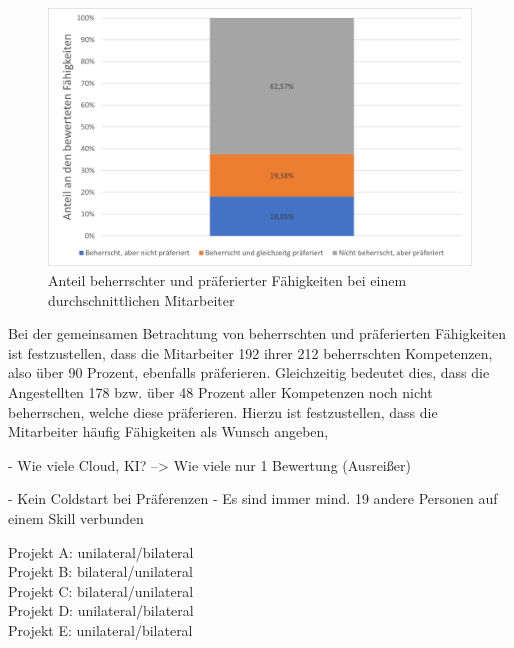\begin{figure}[h]
	\centering
	\includegraphics[width=1\textwidth]{gfx/auswertung-anteil-an-faehigkeiten.png}
	\caption{Anteil beherrschter und präferierter Fähigkeiten bei einem durchschnittlichen Mitarbeiter}
	\label{fig:ergebnisse:analyse:abb3}
\end{figure}


\newpage
Bei der gemeinsamen Betrachtung von beherrschten und präferierten Fähigkeiten ist festzustellen, dass die Mitarbeiter 192 ihrer 212 beherrschten Kompetenzen, also über 90 Prozent, ebenfalls präferieren. Gleichzeitig bedeutet dies, dass die Angestellten 178 bzw. über 48 Prozent aller Kompetenzen noch nicht beherrschen, welche diese präferieren. Hierzu ist festzustellen, dass die Mitarbeiter häufig Fähigkeiten als Wunsch angeben, 

- Wie viele Cloud, KI? --> Wie viele nur 1 Bewertung (Ausreißer)


- Kein Coldstart bei Präferenzen
- Es sind immer mind. 19 andere Personen auf einem Skill verbunden

Projekt A: unilateral/bilateral\\
Projekt B: bilateral/unilateral\\
Projekt C: bilateral/unilateral\\
Projekt D: unilateral/bilateral\\
Projekt E: unilateral/bilateral

